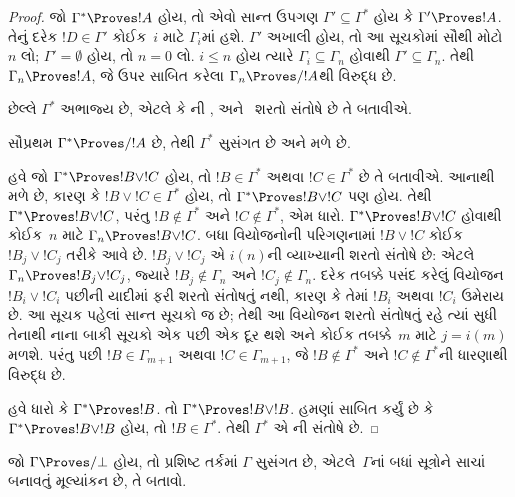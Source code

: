 \documentclass[../../../include/open-logic-section]{subfiles}
\begin{document}
\begin{proof}
  જો $\Gamma^* \Proves !A$ હોય, તો એવો સાન્ત ઉપગણ
  $\Gamma' \subseteq \Gamma^*$ હોય
  કે $\Gamma' \Proves !A$. તેનું દરેક
  $!D \in \Gamma'$ કોઈક~$i$ માટે $\Gamma_i$માં હશે.
  $\Gamma'$ અખાલી હોય, તો આ સૂચકોમાં સૌથી મોટો $n$ લો;
  $\Gamma'=\emptyset$ હોય, તો $n=0$ લો. $i \le n$ હોય ત્યારે
  $\Gamma_i \subseteq \Gamma_n$ હોવાથી
  $\Gamma' \subseteq \Gamma_n$. તેથી
  $\Gamma_n \Proves !A$, જે ઉપર સાબિત કરેલા
  $\Gamma_n \Proves/ !A$થી વિરુદ્ધ છે.

  છેલ્લે $\Gamma^*$ અભાજ્ય છે, એટલે કે
  ની ,
   અને~
  શરતો સંતોષે છે તે બતાવીએ.

  સૌપ્રથમ $\Gamma^* \Proves/ !A$ છે, તેથી
  $\Gamma^*$ સુસંગત છે અને  મળે છે.

  હવે જો $\Gamma^* \Proves !B \lor !C$ હોય, તો
  $!B \in \Gamma^*$ અથવા $!C \in \Gamma^*$ છે તે
  બતાવીએ. આનાથી  મળે છે, કારણ કે
  $!B \lor !C \in \Gamma^*$ હોય, તો
  $\Gamma^* \Proves !B \lor !C$ પણ હોય. તેથી
  $\Gamma^* \Proves !B \lor !C$, પરંતુ
  $!B \notin \Gamma^*$ અને $!C \notin \Gamma^*$,
  એમ ધારો. $\Gamma^* \Proves !B \lor !C$
  હોવાથી કોઈક~$n$ માટે $\Gamma_n \Proves !B \lor !C$.
  બધા વિયોજનોની પરિગણનામાં $!B \lor !C$ કોઈક
  $!B_j \lor !C_j$ તરીકે આવે છે. $!B_j \lor !C_j$
  એ $i(n)$ની વ્યાખ્યાની શરતો સંતોષે છે: એટલે
  $\Gamma_n \Proves !B_j \lor !C_j$, જ્યારે
  $!B_j \notin \Gamma_n$ અને $!C_j \notin \Gamma_n$.
  દરેક તબક્કે પસંદ કરેલું વિયોજન~$!B_i \lor !C_i$
  પછીની યાદીમાં ફરી શરતો સંતોષતું નથી, કારણ કે
  તેમાં $!B_i$ અથવા $!C_i$ ઉમેરાય છે. આ સૂચક
  પહેલાં સાન્ત સૂચકો જ છે; તેથી આ વિયોજન શરતો સંતોષતું
  રહે ત્યાં સુધી તેનાથી નાના બાકી સૂચકો એક પછી એક
  દૂર થશે અને કોઈક તબક્કે~$m$ માટે $j = i(m)$ મળશે.
  પરંતુ પછી $!B \in \Gamma_{m+1}$ અથવા
  $!C \in \Gamma_{m+1}$, જે $!B \notin \Gamma^*$
  અને $!C \notin \Gamma^*$ની ધારણાથી વિરુદ્ધ છે.

  હવે ધારો કે $\Gamma^* \Proves !B$. તો
  $\Gamma^* \Proves !B \lor !B$. હમણાં સાબિત કર્યું
  છે કે $\Gamma^* \Proves !B \lor !B$ હોય, તો
  $!B \in \Gamma^*$. તેથી $\Gamma^*$ એ
  ની  સંતોષે છે.
\end{proof}

\begin{prob}
જો $\Gamma \Proves/ \bot$ હોય, તો પ્રશિષ્ટ તર્કમાં
$\Gamma$ સુસંગત છે, એટલે~$\Gamma$નાં બધાં સૂત્રોને
સાચાં બનાવતું મૂલ્યાંકન છે, તે બતાવો.
\end{prob}
\end{document}
